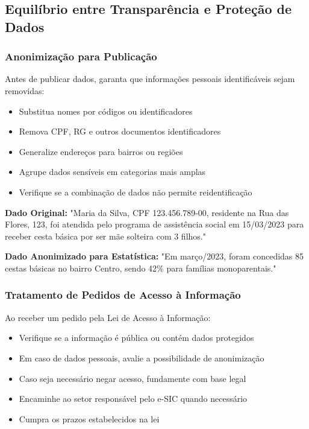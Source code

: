\documentclass[12pt,a4paper]{article}
\begin{document}
\subsection{Equilíbrio entre Transparência e Proteção de Dados}

\subsubsection{Anonimização para Publicação}
Antes de publicar dados, garanta que informações pessoais identificáveis sejam removidas:
\begin{itemize}
    \item Substitua nomes por códigos ou identificadores
    \item Remova CPF, RG e outros documentos identificadores
    \item Generalize endereços para bairros ou regiões
    \item Agrupe dados sensíveis em categorias mais amplas
    \item Verifique se a combinação de dados não permite reidentificação
\end{itemize}

\begin{tcolorbox}[colback=azulclaro, colframe=blue!75!black, title=Exemplo Prático]
\textbf{Dado Original:} "Maria da Silva, CPF 123.456.789-00, residente na Rua das Flores, 123, foi atendida pelo programa de assistência social em 15/03/2023 para receber cesta básica por ser mãe solteira com 3 filhos."

\textbf{Dado Anonimizado para Estatística:} "Em março/2023, foram concedidas 85 cestas básicas no bairro Centro, sendo 42\% para famílias monoparentais."
\end{tcolorbox}

\subsubsection{Tratamento de Pedidos de Acesso à Informação}
Ao receber um pedido pela Lei de Acesso à Informação:
\begin{itemize}
    \item Verifique se a informação é pública ou contém dados protegidos
    \item Em caso de dados pessoais, avalie a possibilidade de anonimização
    \item Caso seja necessário negar acesso, fundamente com base legal
    \item Encaminhe ao setor responsável pelo e-SIC quando necessário
    \item Cumpra os prazos estabelecidos na lei
\end{itemize}
\end{document}
